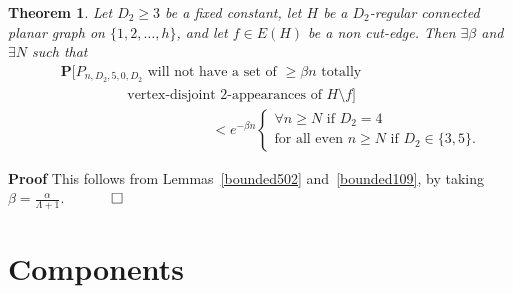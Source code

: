 \documentclass{article}
\newtheorem{Theorem}{Theorem}
\newtheorem{Proof of Theorem}{Proof of Theorem}
\begin{document}
\begin{Theorem} \label{bounded110}
Let $D_{2} \geq 3$ be a fixed constant, 
let $H$ be a $D_{2}$-regular connected planar graph on $\{1,2, \ldots,h \}$,
and let $f \in E(H)$ be a non cut-edge.
Then $\exists \beta$ and $\exists N$ such that
\begin{eqnarray*}
& & \mathbf{P}\Big[\textrm{$P_{n,D_{2},5,0,D_{2}}$ 
will not have a set of $\geq \beta n$ 
totally} \\
& & \phantom{wwwwwwq}\textrm{vertex-disjoint $2$-appearances of $H \setminus f$}\Big] \\
& & \phantom{wwwwwwwwwwwwwww}< e^{- \beta n} 
\left \{ \begin{array}{ll}
\forall n \geq N \textrm{ if } D_{2}=4 \\
\textrm{for all even } n \geq N \textrm{ if } D_{2} \in \{ 3,5 \}.
\end{array} \right.
\end{eqnarray*}
\end{Theorem}
\textbf{Proof}
This follows from Lemmas~\ref{bounded502} and~\ref{bounded109},
by taking $\beta = \frac{\alpha}{\Lambda+1}$.
$\phantom{qwerty}
\setlength{\unitlength}{.25cm}
\begin{picture}(1,1)
\put(0,0){\line(1,0){1}}
\put(0,0){\line(0,1){1}}
\put(1,1){\line(-1,0){1}}
\put(1,1){\line(0,-1){1}}
\end{picture}$ 













































\newpage
\section{Components} \label{cpts}
\end{document}
